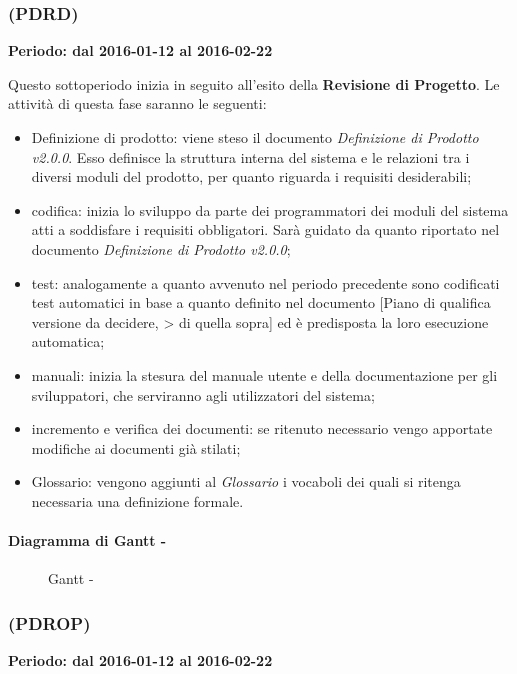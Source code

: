 \documentclass[./PianoDiProgetto.tex]{subfiles}
\begin{document}
  \subsubsection{\PerPDRD{} (PDRD)}
  \textbf{Periodo: dal 2016-01-12 al 2016-02-22}

  Questo sottoperiodo inizia in seguito all'esito della \textbf{Revisione di Progetto}. Le attività di questa fase saranno le seguenti:
  \begin{itemize}
    \item Definizione di prodotto: viene steso il documento \textit{Definizione di Prodotto v2.0.0}. Esso definisce la struttura interna del sistema e le relazioni tra i diversi moduli del prodotto, per quanto riguarda i requisiti desiderabili;
    \item codifica: inizia lo sviluppo da parte dei programmatori dei moduli del sistema atti a soddisfare i requisiti obbligatori. Sarà guidato da quanto riportato nel documento \textit{Definizione di Prodotto v2.0.0};
    \item test: analogamente a quanto avvenuto nel periodo precedente sono codificati test automatici in base a quanto definito nel documento [Piano di qualifica versione da decidere, > di quella sopra] ed è predisposta la loro esecuzione automatica;
    \item manuali: inizia la stesura del manuale utente e della documentazione per gli sviluppatori, che serviranno agli utilizzatori del sistema;
    \item incremento e verifica dei documenti: se ritenuto necessario vengo apportate modifiche ai documenti già stilati;
    \item Glossario: vengono aggiunti al \textit{Glossario} i vocaboli dei quali si ritenga necessaria una definizione formale.
  \end{itemize}

  \paragraph{Diagramma di Gantt - \PerPDRD}
    \begin{figure}[!h]
    \centering
    \caption{Gantt - \PerPDRD}
    \end{figure}

  \subsubsection{\PerPDROP{} (PDROP)}
  \textbf{Periodo: dal 2016-01-12 al 2016-02-22}
\end{document}
